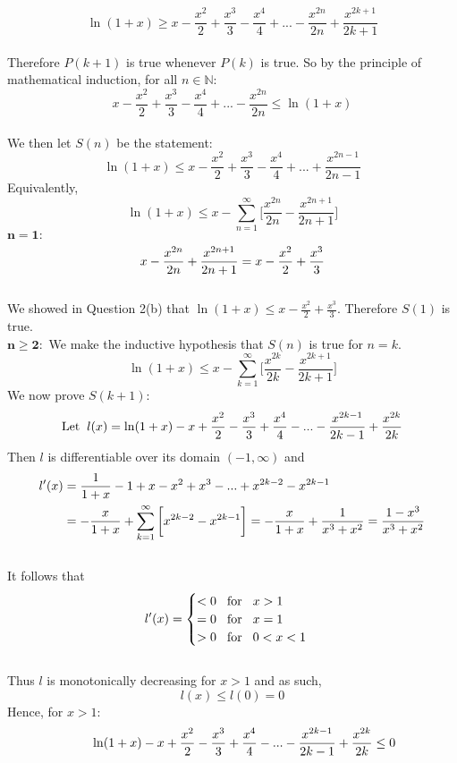 \documentclass[12pt]{amsart}
\begin{document}
\begin{enumerate}
		$$\ln(1+x) \ge x-\frac{x^2}{2}+\frac{x^3}{3}-\frac{x^4}{4}+...-\frac{x^{2n}}{2n}+
		\frac{x^{2k+1}}{2k+1}$$
		\\
		Therefore $P(k+1)$ is true whenever $P(k)$ is true. So by the principle of mathematical induction, 			for all $n \in \mathbb{N}:$ \\
		$$x-\frac{x^2}{2}+\frac{x^3}{3}-\frac{x^4}{4}+...-\frac{x^{2n}}{2n} \le \ln(1+x)$$
		\\
		We then let $S(n)$ be the statement:
		$$\ln(1+x) \le x-\frac{x^2}{2}+\frac{x^3}{3}-\frac{x^4}{4}+...+\frac{x^{2n-1}}{2n-1}$$
		Equivalently,
		$$\ln(1+x) \le x-\sum_{n=1}^\infty \Bigg[\frac{x^{2n}}{2n} - \frac{x^{2n+1}}{2n+1}\Bigg]$$
		$\mathbf{n=1:}$
			\begin{align}
				x- \frac{x^{2n}}{2n} + \frac{x^{2n+1}}{2n+1} = x-\frac{x^2}{2}+\frac{x^3}{3} \notag
			\end{align} \\
		We showed in Question 2(b) that $\ln(1+x) \le x-\frac{x^2}{2}+\frac{x^3}{3}$. Therefore $S(1)$ is 			true. 
		\\
		$\mathbf{n \ge 2:}$ We make the inductive hypothesis that $S(n)$ is true for $n=k$.
		$$\ln(1+x) \le x-\sum_{k=1}^\infty \Bigg[\frac{x^{2k}}{2k} - \frac{x^{2k+1}}{2k+1}\Bigg]$$
		We now prove $S(k+1):$ 
		 $$\text{Let} \hspace{0.2cm} l(x)=\ln(1+x)-x+\frac{x^2}{2}-\frac{x^3}{3}+\frac{x^4}{4}-...
		-\frac{x^{2k-1}}{2k-1}+\frac{x^{2k}}{2k}$$
		Then $l$ is differentiable over its domain $(-1,\infty)$ and
			\begin{align}
				l'(x)&=\frac{1}{1+x}-1+x-x^2+x^3-...+x^{2k-2}-x^{2k-1} \notag \\
				& = -\frac{x}{1+x}+\sum_{k=1}^\infty \bigg[x^{2k-2}-x^{2k-1}\bigg] = -\frac{x}{1+x} +
				\frac{1}{x^3+x^2} = \frac{1-x^3}{x^3+x^2} \notag
			\end{align} \\
		It follows that 
		\begin{align}
				l'(x)= \notag
				\begin{cases}
					<0 \hspace{0.3cm} \text{for} \hspace{0.3cm} x>1 \notag \\
					=0 \hspace{0.3cm} \text{for} \hspace{0.3cm} x=1\notag \\
					>0 \hspace{0.3cm} \text{for} \hspace{0.3cm} 0<x<1 \notag 
				\end{cases}
			\end{align}
		\\				
		Thus $l$ is monotonically decreasing for $x>1$ and as such,
		$$l(x) \le l(0)=0$$
		Hence, for $x>1:$
		$$\text{ } \hspace{0.5cm} \ln(1+x)-x+\frac{x^2}{2}-\frac{x^3}{3}+\frac{x^4}{4}-...-\frac{x^{2k-1}}{2k-1} +		\frac{x^{2k}}{2k}\le 0$$ 
		

\end{enumerate}
\end{document}
